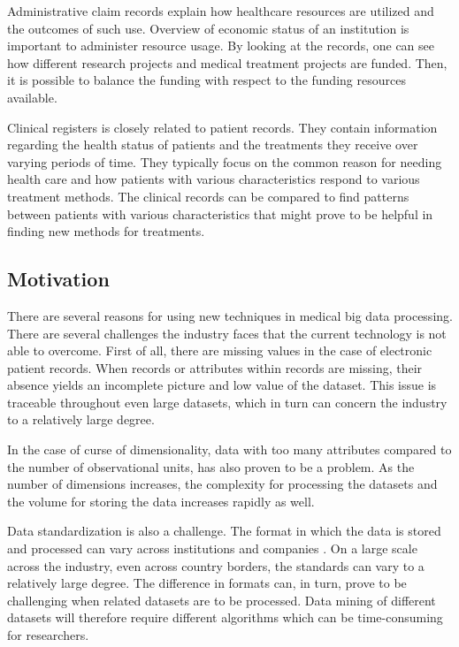 Administrative claim records explain how healthcare resources are utilized and the outcomes of such use. Overview of economic status of an institution is important to administer resource usage. By looking at the records, one can see how different research projects and medical treatment projects are funded. Then, it is possible to balance the funding with respect to the funding resources available. 

Clinical registers is closely related to patient records.\cite{geir} They contain information regarding the health status of patients and the treatments they receive over varying periods of time. They typically focus on the common reason for needing health care and how patients with various characteristics respond to various treatment methods. 
The clinical records can be compared to find patterns between patients with various characteristics that might prove to be helpful in finding new methods for treatments.



\subsection{Motivation}
There are several reasons for using new techniques in medical big data processing. There are several challenges the industry faces that the current technology is not able to overcome. First of all, there are missing values in the case of electronic patient records\cite{wp}. When records or attributes within records are missing, their absence yields an incomplete picture and low value of the dataset. This issue is traceable throughout even large datasets, which in turn can concern the industry to a relatively large degree. 

In the case of curse of dimensionality, data with too many attributes compared to the number of observational units, has also proven to be a problem. As the number of dimensions increases, the complexity for processing the datasets and the volume for storing the data increases rapidly as well. 

Data standardization is also a challenge. The format in which the data is stored and processed can vary across institutions and companies . On a large scale across the industry, even across country borders, the standards can vary to a relatively large degree. The difference in formats can, in turn, prove to be challenging when related datasets are to be processed. Data mining of different datasets will therefore require different algorithms which can be time-consuming for researchers. 

